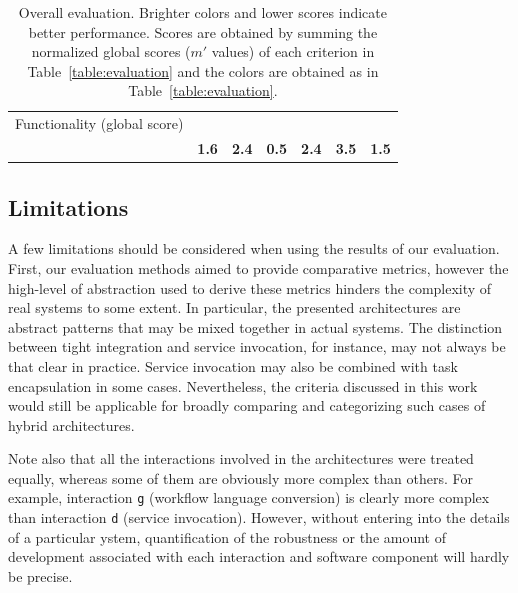 \documentclass[preprint,3p,twocolumn]{elsarticle}
\newcommand{\todo}[2]{\pdfmargincomment[color=red,author=#1,open=true]{#2}}
\newcommand{\correction}[1]{\color{blue}#1\color{black}\xspace}
\begin{document}
\begin{table}
\begin{tabular}{rcccccc}
\correction{Functionality} (global score) & \cellcolor[HTML]{99FF99}{0.00}
                                     & \cellcolor[HTML]{999999}{1.00}
                                     & \cellcolor[HTML]{99FF99}{0.00}
                                     & \cellcolor[HTML]{999999}{1.00}
                                     & \cellcolor[HTML]{99FF99}{0.00}
                                     & \cellcolor[HTML]{99FF99}{0.00}\\
                                    & \cellcolor[HTML]{99DA99}\textbf{1.6}
                                    & \cellcolor[HTML]{99B899}\textbf{\correction{2.4}}
                                    & \cellcolor[HTML]{99FF99}\textbf{0.5}
                                    & \cellcolor[HTML]{99BF99}\textbf{2.4}
                                    & \cellcolor[HTML]{999999}\textbf{3.5}
                                    & \cellcolor[HTML]{99DE99}\textbf{1.5}\\
\end{tabular}
\caption{Overall evaluation. Brighter colors and lower scores indicate better performance. Scores
  are obtained by summing the normalized global scores ($m'$ values) of
  each criterion in Table~\ref{table:evaluation} and the colors are obtained as in Table~\ref{table:evaluation}. }
\label{table:overall}
\end{table}

\subsection{Limitations}


A few limitations should be considered when using the results of our
evaluation. First, our evaluation methods aimed to provide comparative
metrics, however the high-level of abstraction used to derive these
metrics hinders the complexity of real systems to some
extent. In particular, the
presented architectures are abstract patterns that may be mixed
together in actual systems. The distinction between tight integration and
service invocation, for instance, may not always be that clear in
practice. Service invocation may also be combined with task
encapsulation in some cases. Nevertheless, the criteria discussed in this
work would still be applicable for broadly comparing and categorizing such cases of
hybrid architectures.

Note also that all the interactions involved in the architectures were
treated equally, whereas some of them are obviously more complex than
others. For example, interaction \texttt{g} (workflow language
conversion) is clearly more complex than interaction \texttt{d}
(service invocation). However, without entering into the details of a particular \todo{refer to spreadsheet again}
system, quantification of the robustness or the amount of development
associated with each interaction and software component will hardly be
precise.
\end{document}
